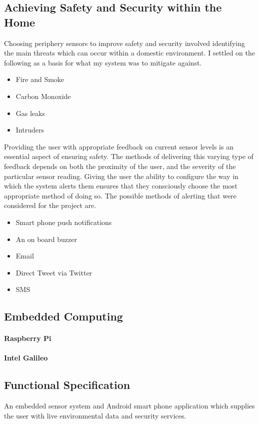 \documentclass{article}
\begin{document}
\subsection{Achieving Safety and Security within the Home}
Choosing periphery sensors to improve safety and security involved identifying the main threats which can occur within a domestic environment. I settled on the following as a basis for what my system was to mitigate against.

\begin{itemize}
  \item Fire and Smoke
  \item Carbon Monoxide
  \item Gas leaks
  \item Intruders 
\end{itemize}

Providing the user with appropriate feedback on current sensor levels is an essential aspect of ensuring safety. The methods of delivering this varying type of feedback depends on both the proximity of the user, and the severity of the particular sensor reading. Giving the user the ability to configure the way in which the system alerts them ensures that they consciously choose the most appropriate method of doing so. The possible methods of alerting that were considered for the project are.

\begin{itemize}
  \item Smart phone push notifications
  \item An on board buzzer
  \item Email	
  \item Direct Tweet via Twitter
  \item SMS 
\end{itemize}

\subsection{Embedded Computing}
\paragraph{Raspberry Pi}
\paragraph{Intel Galileo}

\subsection{Functional Specification}
An embedded sensor system and Android smart phone application which supplies the user with live environmental data and security services. \\\
\end{document}
